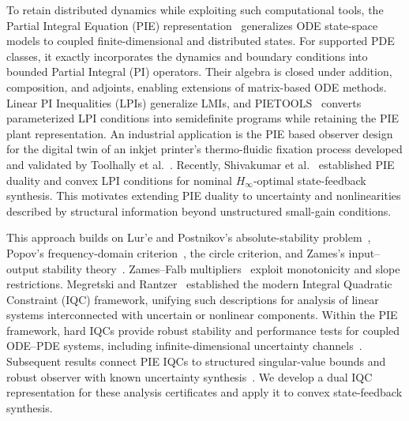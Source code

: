 To retain distributed dynamics while exploiting such computational tools,
the Partial Integral Equation (PIE)
representation~\cite{peet2021pierepresentation,shivakumar2024GDPE}
generalizes ODE state-space models to coupled finite-dimensional and distributed
states. For supported PDE classes, it exactly incorporates the dynamics
and boundary conditions into bounded Partial Integral (PI) operators.
Their algebra is closed under addition, composition, and adjoints,
enabling extensions of matrix-based ODE methods. Linear PI Inequalities (LPIs) generalize LMIs, and
PIETOOLS~\cite{9147712,pietools2025manual} converts parameterized LPI
conditions into semidefinite programs while retaining the PIE plant
representation. An industrial application is the PIE based observer design for
the digital twin
of an inkjet printer's thermo-fluidic fixation process developed and
validated by Toolhally et al.~\cite{TOOLHALLY2026103558}.
Recently, Shivakumar et al.~\cite{shivaknew} established PIE duality and
convex LPI conditions for nominal $H_\infty$-optimal state-feedback
synthesis. This motivates extending PIE duality to uncertainty and
nonlinearities described by structural information beyond unstructured
small-gain conditions.

This approach builds on Lur'e and Postnikov's absolute-stability
problem~\cite{lure1944stability}, Popov's frequency-domain
criterion~\cite{popov1961absolute}, the circle criterion, and Zames's input--output stability
theory~\cite{zames1966input}.
Zames--Falb multipliers~\cite{zames1968stability} exploit monotonicity and
slope restrictions.
Megretski and Rantzer~\cite{megretski1997system} established the modern
Integral Quadratic Constraint (IQC) framework, unifying such descriptions
for analysis of linear systems interconnected with uncertain or nonlinear
components. Within the PIE framework, hard IQCs
provide robust stability and performance tests for coupled ODE--PDE
systems, including infinite-dimensional uncertainty
channels~\cite{9303892,10156335,callegari}. Subsequent results connect PIE IQCs to
structured singular-value bounds and robust observer with known uncertainty
synthesis~\cite{lenssen2025muanalysissynthesisframeworkpartial}.
We develop a dual IQC representation for these analysis certificates and
apply it to convex state-feedback synthesis.

